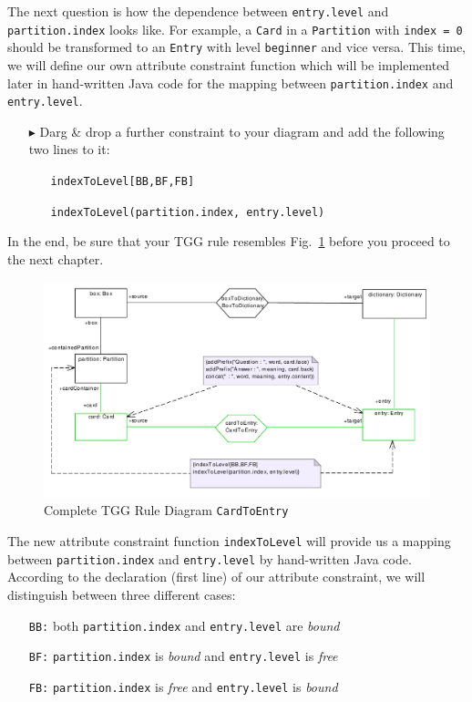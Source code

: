 The next question is how the dependence between \texttt{entry.\-level} and \texttt{par\-ti\-tion.\-index} looks like.
For example, a \texttt{Card} in a \texttt{Partition} with \texttt{index = 0} should be transformed to an \texttt{Entry} with level \texttt{beginner} and vice versa.
This time, we will define our own attribute constraint function which will be implemented later in hand-written Java code for the mapping between \texttt{partition.index} and \texttt{entry.level}. 

\begin{enumerate}
\item[$\blacktriangleright$]Darg \& drop a further constraint to your diagram and add the following two lines to it:

\begin{itemize}
\item[] \texttt{indexToLevel[BB,BF,FB]} 
\item[] \texttt{indexToLevel(partition.index, entry.level)} 
\end{itemize}

\end{enumerate}

In the end, be sure that your TGG rule resembles Fig.~\ref{fig:cardtoentry_complete} before you proceed to the next chapter.

\begin{figure}[htbp]
\begin{center}
  \includegraphics[width=\textwidth]{pics/tggBilder/tggRule/tgg21}
  \caption{Complete TGG Rule Diagram \texttt{CardToEntry}}  
  \label{fig:cardtoentry_complete}
\end{center}
\end{figure}

The new attribute constraint function \texttt{indexToLevel} will provide us a mapping between \texttt{partition.index} and \texttt{entry.level} by hand-written Java code. 
According to the declaration (first line) of our attribute constraint, we will distinguish between three different cases:

\begin{itemize}
\item[] \texttt{BB:} both \texttt{partition.index} and \texttt{entry.level} are \emph{bound}
\item[] \texttt{BF:} \texttt{partition.index} is \emph{bound} and \texttt{entry.level} is \emph{free}
\item[] \texttt{FB:} \texttt{partition.index} is \emph{free} and \texttt{entry.level} is \emph{bound} 
\end{itemize}